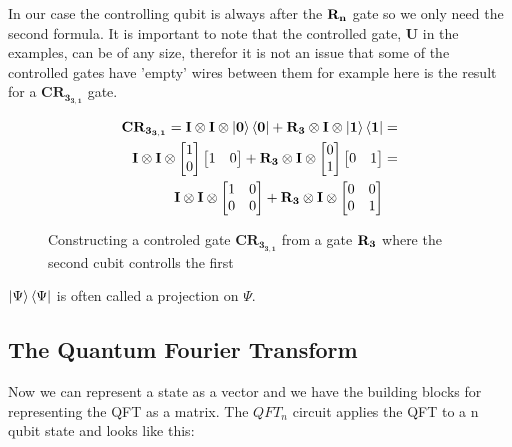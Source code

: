 In our case the controlling qubit is always after the $\mathbf{R_{n}}$ gate so we only need the second formula. 
It is important to note that the controlled gate, $\mathbf{U}$ in the examples, can be of any size, therefor it is not an issue that some of the controlled gates have 'empty' wires between them for example here is the result for a $\mathbf{CR_{3_{3,1}}}$ gate. 
\begin{figure}[H]
    \begin{align*}
        \mathbf{CR_{3_{3,1}}}=\mathbf{I}\otimes\mathbf{I}\otimes\ket{\mathbf{0}}\bra{\mathbf{0}} + \mathbf{R_{3}}\otimes\mathbf{I}\otimes\ket{\mathbf{1}}\bra{\mathbf{1}}&=\\
        \mathbf{I}\otimes\mathbf{I}\otimes
        \begin{bmatrix}
            1 \\
            0 \\
        \end{bmatrix}
        \begin{bmatrix}
            1 & 0 \\
        \end{bmatrix}+
        \mathbf{R_{3}}\otimes\mathbf{I}\otimes
        \begin{bmatrix}
            0 \\
            1 \\
        \end{bmatrix}
        \begin{bmatrix}
            0 & 1 \\
        \end{bmatrix}
        &=\\
        \mathbf{I}\otimes\mathbf{I}\otimes
        \begin{bmatrix}
            1 & 0 \\
            0 & 0 \\
        \end{bmatrix}+ 
        \mathbf{R_{3}}\otimes\mathbf{I}\otimes
        \begin{bmatrix}
            0 & 0 \\
            0 & 1 \\
        \end{bmatrix}& 
    \end{align*}
    \caption{Constructing a controled gate $\mathbf{CR_{3_{3,1}}}$ from a gate $\mathbf{R_{3}}$ where the second cubit controlls the first}
    \label{fig:CR3}
\end{figure}
\noindent
$\ket{\Psi}\bra{\Psi}$ is often called a projection on $\Psi$. 
\subsection{The Quantum Fourier Transform}\label{sec:qft}
Now we can represent a state as a vector and we have the building blocks for representing the QFT as a matrix. The $QFT_n$ circuit applies the QFT to a n qubit state and looks like this:

